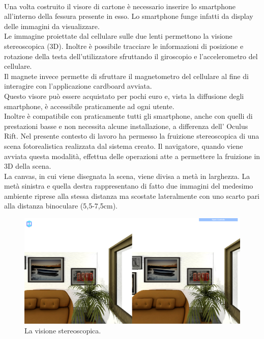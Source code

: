\\
Una volta costruito il visore di cartone è necessario inserire lo smartphone all’interno della fessura presente in esso. Lo smartphone funge infatti da display delle immagini da visualizzare.
\\
Le immagine proiettate dal cellulare sulle due lenti permettono la visione stereoscopica (3D).
Inoltre è possibile tracciare le informazioni di posizione e rotazione della testa dell’utilizzatore sfruttando il giroscopio e l’accelerometro del cellulare. 
\\
Il magnete invece permette di sfruttare il magnetometro del cellulare al fine di interagire con l’applicazione cardboard avviata.
\\
Questo visore può essere acquistato per pochi euro e, vista la diffusione degli smartphone, è accessibile praticamente ad ogni utente. 
\\
Inoltre è compatibile con praticamente tutti gli smartphone, anche con quelli di prestazioni basse e non necessita alcune installazione, a differenza dell’ Oculus Rift.
Nel presente contesto di lavoro ha permesso la fruizione stereoscopica di una scena fotorealistica realizzata dal sistema creato.
Il navigatore, quando viene avviata questa modalità, effettua delle operazioni atte a permettere la fruizione in 3D della scena. 
\\
La canvas, in cui viene disegnata la scena, viene divisa a metà in larghezza. La metà sinistra e  quella destra rappresentano di fatto due immagini del medesimo ambiente riprese alla stessa distanza ma scostate lateralmente con uno scarto pari alla distanza binoculare (5,5-7,5cm).
\begin{figure}[htb]
 \centering
 \includegraphics[width=1\linewidth]{images/chapter_navigazione_scena/immag_virt.png}\hfill
 \caption[Visione stereoscopica.]{La visione stereoscopica.}
 \label{fig:navigazione_scena_navigator_immag_virt}
\end{figure}
